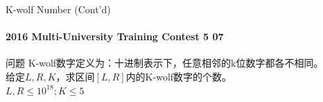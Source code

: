 \documentclass[hyperref={unicode=true}]{beamer}
\theoremstyle{definition}
\theoremstyle{proof}
\begin{document}
\begin{frame}{K-wolf Number (Cont'd)}\framesubtitle{2016 Multi-University Training Contest 5 07}
  \begin{block}{问题}
    K-wolf数字定义为：十进制表示下，任意相邻的k位数字都各不相同。\\
    给定$L,R,K$，求区间$[L,R]$内的K-wolf数字的个数。\\
    $L,R\leq10^{18};K\leq5$
  \end{block}
\end{frame}
\end{document}
